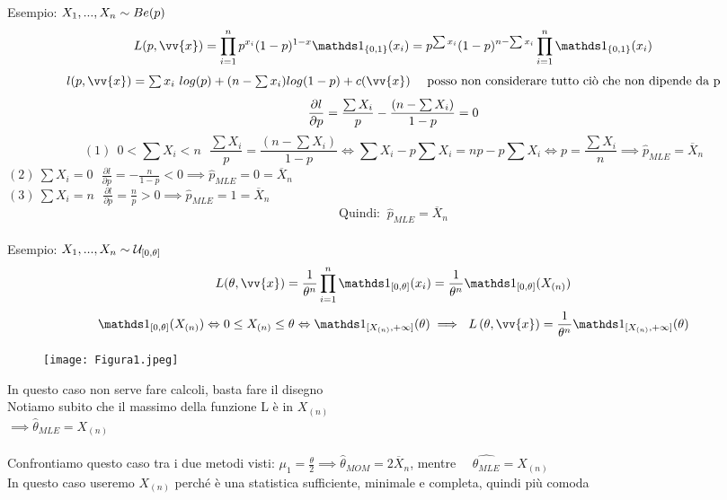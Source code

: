 Esempio: $X_1,...,X_n\sim Be(p)$
\[L(p,\vv{x})=\Prod{i=1}{n} p^{x_i}(1-p)^{1-x} \II_{\{0,1\}}(x_i) = p^{\sum x_i}(1-p)^{n-\sum x_i} \Prod{i=1}{n} \II_{\{0,1\}}(x_i) \]
\[  \textstyle l(p,\vv{x})=\sum x_i \ log(p) + (n-\sum x_i) log(1-p) + c(\vv{x}) \ \ \ \text{ posso non considerare tutto ciò che non dipende da p} \]
\[ \frac{\partial l}{\partial p} = \frac{\sum X_i}{p} - \frac{(n-\sum X_i)}{1-p} = 0\skipp\]
\[ (1) \ \ 0<\sum X_i < n \ \ \ \frac{\sum X_i}{p}=\frac{(n-\sum X_i)}{1-p} \Leftrightarrow \sum X_i -p\sum X_i = np - p\sum X_i \Leftrightarrow p=\frac{\sum X_i}{n} \implies \hat{p}_{MLE}=\overline{X}_n\]
$ \displaystyle (2) \ \sum X_i =0 \ \ \ \frac{\partial l}{\partial p}= -\frac{n}{1-p}<0 \implies \hat{p}_{MLE}=0=\overline{X}_n $\skipp\\
$\displaystyle(3) \  \sum X_i = n \ \ \ \frac{\partial l }{\partial p}=\frac{n}{p}>0 \implies \hat{p}_{MLE}=1=\overline{X}_n $
\[\text{Quindi: } \ \hat{p}_{MLE}=\overline{X}_n\] \\

Esempio: $X_1,...,X_n \sim \mathcal U_{[0,\theta]}$
\[L(\theta,\vv{x})=\frac{1}{\theta^n}\Prod{i=1}{n} \II_{[0,\theta]}(x_i)=\frac{1}{\theta^n}\II_{[0,\theta]}(X_{(n)})\]
\[\II_{[0,\theta]}(X_{(n)}) \Leftrightarrow 0\le X_{(n)}\le \theta \Leftrightarrow \II_{[X_{(n)},+\infty]}(\theta) \implies \ L\O\theta,\vv{x}\C=\frac{1}{\theta^n}\II_{[X_{(n)},+\infty]}(\theta)\]
\begin{wrapfigure}{r}{0.25\textwidth}
\texttt{[image: Figura1.jpeg]}
\end{wrapfigure}
\phantom{x}

In questo caso non serve fare calcoli, basta fare il disegno\\
Notiamo subito che il massimo della funzione L è in $X_{(n)}$\\
$ \implies \hat{\theta}_{MLE}=X_{(n)}$\\ \\

Confrontiamo questo caso tra i due metodi visti:
$\mu_1=\frac{\theta}{2}\implies \hat{\theta}_{MOM}=2\overline{X}_n$, mentre \ \ $\hat{\theta_{MLE}}=X_{(n)}$\\
In questo caso useremo $X_{(n)}$ perché è una statistica sufficiente, minimale e completa, quindi più comoda\\ \\



